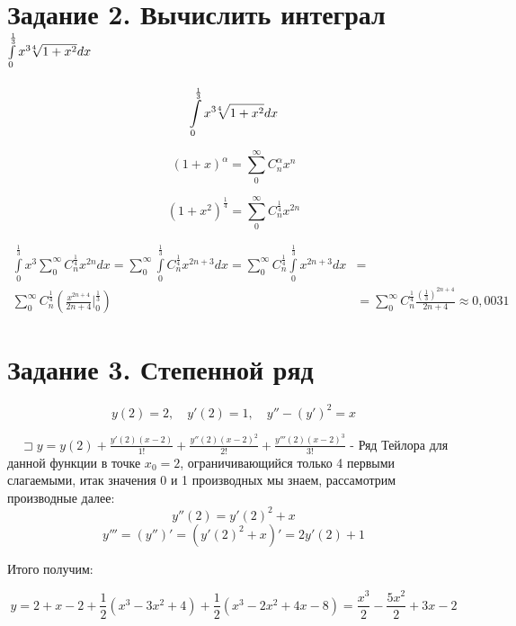 \documentclass{article}
\begin{document}


\section{Задание 2. Вычислить интеграл $\int\limits_{0}^{\frac{1}{3}} x^3 \sqrt[\leftroot{4} 4]{1 + x^2}dx$}

\[ 
\int\limits_{0}^{\frac{1}{3}} x^3  \sqrt[\leftroot{4} 4]{1 + x^2}dx 
\]

\[ 
(1 + x)^{\alpha} = \sum\limits_{0}^{\infty} C_{n}^{\alpha} x^{n} 
\]

\[ 
(1 + x^2)^{\frac{1}{4}} =  \sum\limits_{0}^{\infty} C_{n}^{\frac{1}{4}} x^{2n} 
\]

\[ 
\begin{split}
\int\limits_{0}^{\frac{1}{3}} x^3 \sum\limits_{0}^{\infty} C_{n}^{\frac{1}{4}} x^{2n}dx = 
\sum\limits_{0}^{\infty}\int\limits_{0}^{\frac{1}{3}}  C_{n}^{\frac{1}{4}} x^{2n+3}dx = 
\sum\limits_{0}^{\infty} C_{n}^{\frac{1}{4}} \int\limits_{0}^{\frac{1}{3}}   x^{2n+3}dx &= \\
\sum\limits_{0}^{\infty} C_{n}^{\frac{1}{4}} \left(  \frac{x^{2n+4}}{2n+4} \Big|_{0}^{\frac{1}{3}} \right) &= \sum\limits_{0}^{\infty} C_{n}^{\frac{1}{4}} \frac{\left(\frac{1}{3}\right)^{2n+4}}{2n+4} \approx 0,0031 
\end{split}
\]


\section{Задание 3. Степенной ряд}

\[ 
y(2) = 2, \quad y'(2) = 1, \quad y'' - (y')^2 = x
\]

$\quad\sqsupset y = y(2) + \frac{y'(2)(x-2)}{1!} + \frac{y''(2)(x-2)^2}{2!} + \frac{y'''(2)(x-2)^3}{3!}$ - Ряд Тейлора для данной функции в точке $x_0 = 2$, ограничивающийся только 4 первыми слагаемыми, итак значения 0 и 1 производных мы знаем, рассамотрим производные далее:
\[
    y''(2) = y'(2)^2 + x
\]
\[
    y''' = (y'')' = (y'(2)^2 + x)' = 2y'(2) + 1
\]  

Итого получим:

\[
y = 2 + x - 2 + \frac{1}{2}(x^3-3x^2+4) + \frac{1}{2}(x^3 - 2x^2 + 4x - 8) = \frac{x^3}{2}-\frac{5x^2}{2}+3x-2
\]
\end{document}
